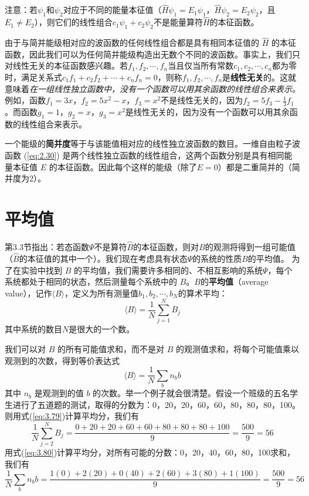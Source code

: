 	 注意：若$\psi_1$和$\psi_2$对应于不同的能量本征值（$\hat{H}\psi_1 = E_1\psi_1$，$\hat{H}\psi_2 = E_2\psi_2$，且$E_1 \neq E_2$），则它们的线性组合$c_1\psi_1+c_2\psi_2$不是能量算符$\hat{H}$的本征函数。

	由于与简并能级相对应的波函数的任何线性组合都是具有相同本征值的 $\hat{H}$ 的本征函数，因此我们可以为任何简并能级构造出无数个不同的波函数。事实上，我们只对线性无关的本征函数感兴趣。若$f_1,f_2,\cdots,f_n$当且仅当所有常数$c_1,c_2,\cdots,c_n$都为零时，满足关系式$c_1f_1+c_2f_2+\cdots+c_nf_n=0$，则称$f_1,f_2,\cdots,f_n$是\textbf{线性无关}的。这就意味着\textit{在一组线性独立函数中，没有一个函数可以用其余函数的线性组合来表示。}例如，函数$f_1=3x$，$f_2=5x^2-x$，$f_3=x^2$不是线性无关的，因为$f_2=5f_3-\frac{1}{3}f_1$。而函数$g_1=1$，$g_2=x$，$g_3=x^2$是线性无关的，因为没有一个函数可以用其余函数的线性组合来表示。

	 一个能级的\textbf{简并度}等于与该能值相对应的线性独立波函数的数目。一维自由粒子波函数 (\ref{eq:2.30}) 是两个线性独立函数的线性组合，这两个函数分别是具有相同能量本征值 $E$ 的本征函数。因此每个这样的能级（除了$E=0$）都是二重简并的（简并度为2）。

\section{平均值}
\label{sec:3.7 Average Values}
	第3.3节指出：若态函数$\Psi$不是算符$\hat{B}$的本征函数，则对$B$的观测将得到一组可能值（$\hat{B}$的本征值的其中一个）。我们现在考虑具有状态$\Psi$的系统的性质$B$的平均值。
	为了在实验中找到 $B$ 的平均值，我们需要许多相同的、不相互影响的系统$\Psi$，每个系统都处于相同的状态，然后测量每个系统中的 $B$。$B$的\textbf{平均值}（average value），记作$\langle B \rangle$，定义为所有测量值$b_1,b_2,\cdots,b_N$的算术平均：
	\begin{equation}
		\langle B \rangle = \frac{1}{N}\sum_{j=1}^{N}B_j
		\label{eq:3.79}
	\end{equation}
	其中系统的数目$N$是很大的一个数。

	我们可以对 $B$ 的所有可能值求和，而不是对 $B$ 的观测值求和，将每个可能值乘以观测到的次数，得到等价表达式
	\begin{equation}
		\langle B \rangle = \frac{1}{N}\sum_{b}n_bb
		\label{eq:3.80}
	\end{equation}
	其中 $n_b$ 是观测到的值 $b$ 的次数。举一个例子就会很清楚。假设一个班级的五名学生进行了五道题的测试，取得的分数为：0，20，20，60，60，80，80，80，100。则用式(\ref{eq:3.79})计算平均分，我们有
	\begin{equation*}
		\frac{1}{N}\sum_{j=2}^{N}B_j = \frac{0+20+20+60+60+80+80+80+100}{9} = \frac{500}{9} = 56
	\end{equation*}
	用式(\ref{eq:3.80})计算平均分，对所有可能的分数：0，20，40，60，80，100求和，我们有
	\begin{equation*}
		\frac{1}{N}\sum_{b}n_bb = \frac{1\left(0\right)+2\left(20\right)+0\left(40\right)+2\left(60\right)+3\left(80\right)+1\left(100\right)}{9} = \frac{500}{9} = 56
	\end{equation*}

